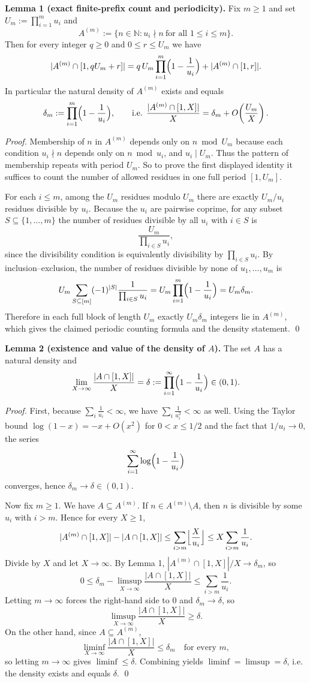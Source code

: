 \medskip
\noindent\textbf{Lemma 1 (exact finite-prefix count and periodicity).}
Fix $m\ge 1$ and set $U_m:=\prod_{i=1}^m u_i$ and
\[A^{(m)}:=\{n\in\mathbb N: u_i\nmid n\ \text{for all }1\le i\le m\}.
\]
Then for every integer $q\ge 0$ and $0\le r\le U_m$ we have
\[
|A^{(m)}\cap[1,qU_m+r]| = q\,U_m\prod_{i=1}^m\Bigl(1-\frac{1}{u_i}\Bigr) + |A^{(m)}\cap[1,r]|.
\]
In particular the natural density of $A^{(m)}$ exists and equals
\[\delta_m:=\prod_{i=1}^m\Bigl(1-\frac{1}{u_i}\Bigr),\qquad\text{i.e. }\frac{|A^{(m)}\cap[1,X]|}{X}=\delta_m+O\!\left(\frac{U_m}{X}\right).
\]

\noindent\emph{Proof.}
Membership of $n$ in $A^{(m)}$ depends only on $n\bmod U_m$ because each condition $u_i\nmid n$ depends only on $n\bmod u_i$, and $u_i\mid U_m$.
Thus the pattern of membership repeats with period $U_m$.
So to prove the first displayed identity it suffices to count the number of allowed residues in one full period $[1,U_m]$.

For each $i\le m$, among the $U_m$ residues modulo $U_m$ there are exactly $U_m/u_i$ residues divisible by $u_i$.
Because the $u_i$ are pairwise coprime, for any subset $S\subseteq\{1,\dots,m\}$ the number of residues divisible by all $u_i$ with $i\in S$ is
\[\frac{U_m}{\prod_{i\in S}u_i},
\]
since the divisibility condition is equivalently divisibility by $\prod_{i\in S}u_i$.
By inclusion--exclusion, the number of residues divisible by none of $u_1,\dots,u_m$ is
\[
U_m\sum_{S\subseteq[m]}(-1)^{|S|}\frac{1}{\prod_{i\in S}u_i}=U_m\prod_{i=1}^m\Bigl(1-\frac{1}{u_i}\Bigr)=U_m\delta_m.
\]
Therefore in each full block of length $U_m$ exactly $U_m\delta_m$ integers lie in $A^{(m)}$, which gives the claimed periodic counting formula and the density statement. \qed

\medskip
\noindent\textbf{Lemma 2 (existence and value of the density of $A$).}
The set $A$ has a natural density and
\[\lim_{X\to\infty}\frac{|A\cap[1,X]|}{X}=\delta:=\prod_{i=1}^{\infty}\Bigl(1-\frac{1}{u_i}\Bigr)\in(0,1).
\]

\noindent\emph{Proof.}
First, because $\sum_i \frac1{u_i}<\infty$, we have $\sum_i \frac1{u_i^2}<\infty$ as well.
Using the Taylor bound $\log(1-x)=-x+O(x^2)$ for $0<x\le 1/2$ and the fact that $1/u_i\to 0$, the series
\[\sum_{i=1}^{\infty}\log\Bigl(1-\frac1{u_i}\Bigr)
\]
converges, hence $\delta_m\to\delta\in(0,1)$.

Now fix $m\ge 1$. We have $A\subseteq A^{(m)}$.
If $n\in A^{(m)}\setminus A$, then $n$ is divisible by some $u_i$ with $i>m$.
Hence for every $X\ge 1$,
\[
|A^{(m)}\cap[1,X]|-|A\cap[1,X]|\le \sum_{i>m}\Bigl\lfloor\frac{X}{u_i}\Bigr\rfloor\le X\sum_{i>m}\frac1{u_i}.
\]
Divide by $X$ and let $X\to\infty$. By Lemma 1, $|A^{(m)}\cap[1,X]|/X\to\delta_m$, so
\[
0\le \delta_m-\limsup_{X\to\infty}\frac{|A\cap[1,X]|}{X} \le \sum_{i>m}\frac1{u_i}.
\]
Letting $m\to\infty$ forces the right-hand side to $0$ and $\delta_m\to\delta$, so
\[\limsup_{X\to\infty}\frac{|A\cap[1,X]|}{X}\ge \delta.
\]
On the other hand, since $A\subseteq A^{(m)}$,
\[\liminf_{X\to\infty}\frac{|A\cap[1,X]|}{X}\le \delta_m\quad\text{for every }m,
\]
so letting $m\to\infty$ gives $\liminf\le \delta$.
Combining yields $\liminf=\limsup=\delta$, i.e. the density exists and equals $\delta$. \qed

